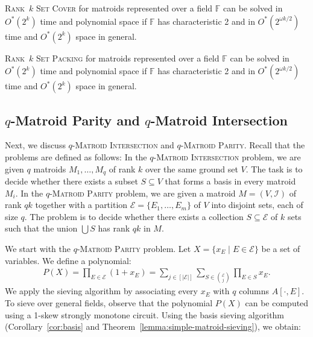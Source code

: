 \documentclass{theoretics}
\newcommand{\F}{\ensuremath{\mathbb F}\xspace}
\newcommand{\cI}{\ensuremath{\mathcal I}\xspace}
\newcommand{\cE}{\ensuremath{\mathcal E}\xspace}
\begin{document}
\begin{theorem} \label{theoremm:setcover}
  \textsc{Rank~$k$ Set Cover} for
  matroids represented over a field $\F$ can be solved
  in $O^*(2^k)$ time and polynomial space if $\F$ has characteristic 2 and in $O^*(2^{\omega k / 2})$ time and $O^*(2^k)$ space in general. 
\end{theorem}

\begin{theorem} \label{theoremm:setpacking}
  \textsc{Rank~$k$ Set Packing} for
  matroids represented over a field $\F$ can be solved
  in $O^*(2^k)$ time and polynomial space if $\F$ has characteristic 2 and in $O^*(2^{\omega k / 2})$ time and $O^*(2^k)$ space in general. 
\end{theorem}

\subsection{\texorpdfstring{$q$}{q}-Matroid Parity and \texorpdfstring{$q$}{q}-Matroid Intersection}
Next, we discuss \textsc{$q$-Matroid Intersection} and \textsc{$q$-Matroid Parity}.
Recall that the problems are defined as follows:
In the \textsc{$q$-Matroid Intersection} problem, we are given $q$ matroids $M_1, \dots, M_q$ of rank $k$ over the same ground set $V$. The task is to decide whether there exists a subset $S \subseteq V$ that forms a basis in every matroid $M_i$.
In the \textsc{$q$-Matroid Parity} problem, we are given a matroid $M=(V,\cI)$ of rank $qk$ together with a partition $\cE=\{E_1,\dots,E_m\}$ of $V$ into disjoint sets, each of size $q$.
The problem is to decide whether there exists a collection $S\subseteq \cE$ of $k$ sets such that the union $\bigcup S$ has rank $qk$ in $M$.

We start with the \textsc{$q$-Matroid Parity} problem.
Let $X = \{ x_{E} \mid E \in \cE \}$ be a set of variables.
We define a polynomial:
\begin{align*}
  P(X) = \prod_{E \in \cE} \left( 1 +x_E \right)
  = \sum_{j \in [|\cE|]} \sum_{S \in \binom{\cE}{j}} \prod_{E \in S} x_E.
\end{align*}
We apply the sieving algorithm by associating every $x_E$ with $q$ columns $A[\cdot, E]$.
To sieve over general fields, observe that the polynomial $P(X)$ can be computed using a 1-skew strongly monotone circuit.
Using the basis sieving algorithm (Corollary~\ref{cor:basis} and Theorem~\ref{lemma:simple-matroid-sieving}), we obtain:
\end{document}
